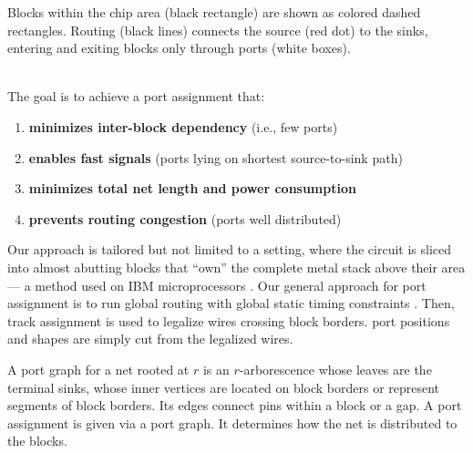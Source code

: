 \documentclass[a2paper]{bigsposter}
\begin{document}
\begin{blockrow}[3]
\begin{minipage}{0.45\blockwidth}
    \raggedright
    {\tiny \begin{spacing}{0.9}
    	Blocks within the chip area (black rectangle) are shown as colored dashed rectangles. Routing (black lines) connects the source (red dot) to the sinks, entering and exiting blocks only through ports (white boxes).\end{spacing}	}
    \end{minipage}\\

 \label{sec:modfied_global;_routing}
 The goal is to achieve a port assignment that:
 \begin{enumerate}
 	\item \textbf{minimizes inter-block dependency} (i.e., few ports)
 	\item \textbf{enables fast signals} (ports lying on shortest source-to-sink path)
 	\item  \textbf{minimizes total net length and power consumption}
 	\item \textbf{prevents routing congestion} (ports well distributed)
 \end{enumerate}
 Our approach is tailored but not limited to a setting, where the
 circuit is sliced into almost abutting blocks that ``own'' the
 complete metal stack above their area — a method used
 on IBM microprocessors \cite{kazda+pangea:21}.
Our general approach for port assignment is to run global routing with
global static timing constraints \cite{BRGTiming2}. Then, track
assignment \cite{BatterywalaTrackAssign,duran:2024} is used  to legalize wires crossing block borders.
port positions and shapes are simply cut from the legalized wires.


A port graph for a net rooted at $r$ is an $r$-arborescence whose
leaves are the terminal sinks, whose inner vertices are located on block
borders or represent segments of block borders. Its edges connect pins 
within a block or a gap. A port assignment is given via a port graph.
It determines how the net is distributed to the blocks.





\end{blockrow}
\end{document}
